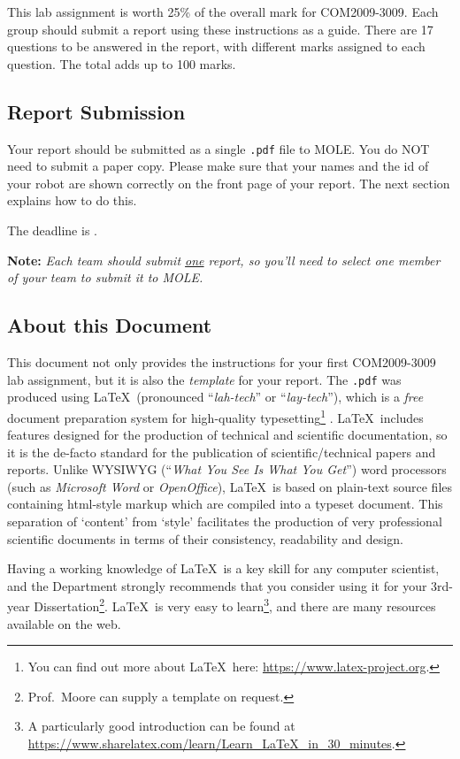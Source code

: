 \documentclass[hidelinks,a4paper,11pt]{article}
\newcounter{question}
\begin{document}
This lab assignment is worth 25\% of the overall mark for COM2009-3009.  Each group should submit a report using these instructions as a guide.  There are 17 questions to be answered in the report, with different marks assigned to each question.  The total adds up to 100 marks.


\subsection{Report Submission}

Your report should be submitted as a single \texttt{.pdf} file to MOLE.  You do NOT need to submit a paper copy.   Please make sure that your names and the id of your robot are shown correctly on the front page of your report.  The next section explains how to do this.

The deadline is {\color{red}{\bfseries midnight Friday 15th March 2019}}.

{\bfseries Note:}  \emph{Each team should submit \underline{one} report, so you'll need to select one member of your team to submit it to MOLE.}


\subsection{About this Document}

This document not only provides the instructions for your first COM2009-3009 lab assignment, but it is also the \emph{template} for your report.  The \texttt{.pdf} was produced using \LaTeX\ (pronounced ``\emph{lah-tech}'' or ``\emph{lay-tech}''), which is a \emph{free} document preparation system for high-quality typesetting\footnote{You can find out more about \LaTeX\ here: \url{https://www.latex-project.org}.} .  \LaTeX\ includes features designed for the production of technical and scientific documentation, so it is the de-facto standard for the publication of scientific/technical papers and reports.  Unlike WYSIWYG (``\emph{What You See Is What You Get}'') word processors (such as \emph{Microsoft Word} or \emph{OpenOffice}), \LaTeX\ is based on plain-text source files containing html-style markup which are compiled into a typeset document.  This separation of `content' from `style' facilitates the production of very professional scientific documents in terms of their consistency, readability and design.

Having a working knowledge of \LaTeX\ is a key skill for any computer scientist, and the Department strongly recommends that you consider using it for your 3rd-year Dissertation\footnote{Prof.\ Moore can supply a template on request.}.  \LaTeX\ is very easy to learn\footnote{A particularly good introduction can be found at \url{https://www.sharelatex.com/learn/Learn_LaTeX_in_30_minutes}.}, and there are many resources available on the web.
\end{document}

